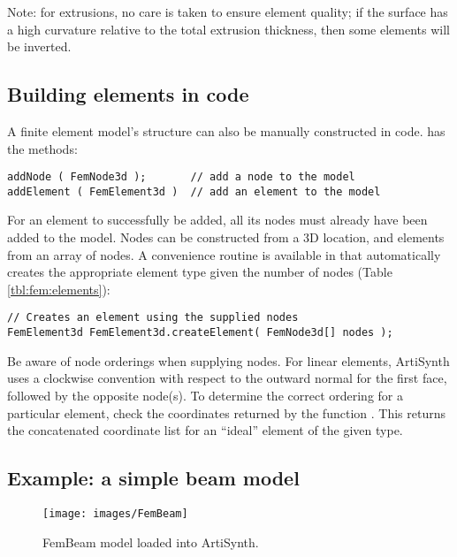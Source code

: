 \begin{sideblock}
Note: for extrusions, no care is taken to ensure element quality; if the 
surface has a high curvature relative to the total extrusion thickness, 
then some elements will be inverted.
\end{sideblock}

\subsection{Building elements in code}

A finite element model's structure can also be manually constructed in code.  
 has the methods:
\begin{lstlisting}[]
addNode ( FemNode3d );       // add a node to the model
addElement ( FemElement3d )  // add an element to the model
\end{lstlisting}
For an element to successfully be added, all its nodes must already have
been added to the model.  Nodes can be constructed from a 3D location, and
elements from an array of nodes.  A convenience routine is available in
 that automatically creates
the appropriate element type given the number of nodes (Table 
\ref{tbl:fem:elements}):
\begin{lstlisting}[]
// Creates an element using the supplied nodes
FemElement3d FemElement3d.createElement( FemNode3d[] nodes );
\end{lstlisting}
Be aware of node orderings when supplying nodes.  For linear elements, 
ArtiSynth uses a clockwise convention with respect to the outward
normal for the first face, followed by the opposite node(s).  To determine the
correct ordering for a particular element, check the coordinates returned by 
the function 
.
This returns the concatenated coordinate list for an ``ideal'' element of
the given type.

\subsection{Example: a simple beam model}
\label{sec:fem:example:fembeam}

\begin{figure}[ht]
	\centering
	\texttt{[image: images/FemBeam]}
	\caption{FemBeam model loaded into ArtiSynth.}
	\label{fig:fem:beam}
\end{figure}

